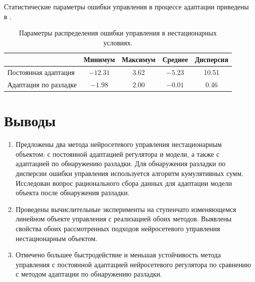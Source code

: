Статистические параметры ошибки управления в процессе адаптации
приведены в .

\begin{table}
  \caption{Параметры распределения ошибки управления в нестационарных условиях.}
  \label{tabl:nonst_state_distrib}
  \begin{tabular}{|l|c|c|c|c|}
    \hline
    & Минимум & Максимум & Среднее & Дисперсия\\
    \hline
    Постоянная адаптация&
    $-12.31$ & 3.62 & $-5.23$ & 10.51\\
    \hline
    Адаптация по разладке&
    $-1.98$ & 2.00 & $-0.01$ & 0.46\\
    \hline
  \end{tabular}
\end{table}

\section{Выводы}

\begin{enumerate}
\item Предложены два метода нейросетевого управления нестационарным
  объектом: с постоянной адаптацией регулятора и модели, а также с
  адаптацией по обнаружению разладки.  Для обнаружения разладки по
  дисперсии ошибки управления используется алгоритм кумулятивных сумм.
  Исследован вопрос рационального сбора данных для адаптации модели
  объекта после обнаружения разладки.
\item Проведены вычислительные эксперименты на ступенчато изменяющемся
  линейном объекте управления с реализацией обоих методов.  Выявлены
  свойства обоих рассмотренных подходов нейросетевого управления
  нестационарным объектом.
\item Отмечено большее быстродействие и меньшая устойчивость метода
  управления с постоянной адаптацией нейросетевого регулятора по
  сравнению с методом адаптации по обнаружению разладки.
\end{enumerate}
